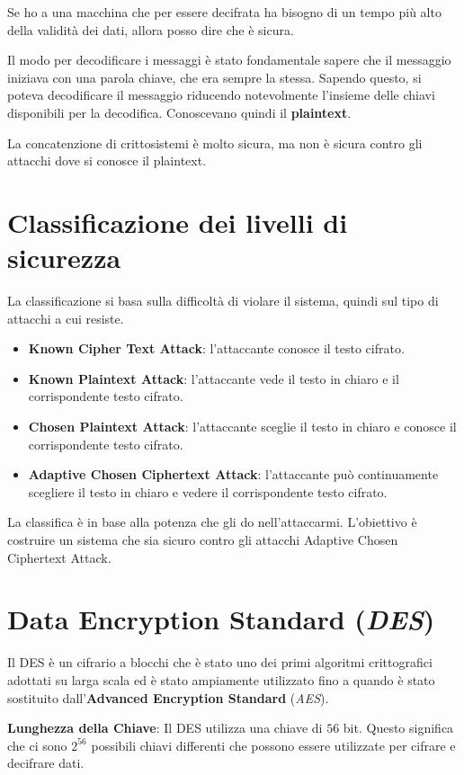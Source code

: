 Se ho a una macchina che per essere decifrata ha bisogno di un tempo più alto della validità 
dei dati, allora posso dire che è sicura.

Il modo per decodificare i messaggi è stato fondamentale sapere che il messaggio iniziava con
una parola chiave, che era sempre la stessa. Sapendo questo, si poteva decodificare il messaggio
riducendo notevolmente l'insieme delle chiavi disponibili per la decodifica.
Conoscevano quindi il \textbf{plaintext}.

La concatenzione di crittosistemi è molto sicura, ma non è sicura contro gli attacchi
dove si conosce il plaintext.

\section{Classificazione dei livelli di sicurezza}
La classificazione si basa sulla difficoltà di violare il sistema, quindi sul tipo di 
attacchi a cui resiste.
\begin{itemize}
    \item \textbf{Known Cipher Text Attack}: l'attaccante conosce il testo cifrato.
    \item \textbf{Known Plaintext Attack}: l'attaccante vede il testo in chiaro e il corrispondente testo cifrato.
    \item \textbf{Chosen Plaintext Attack}: l'attaccante sceglie il testo in chiaro e conosce il corrispondente testo cifrato.
    \item \textbf{Adaptive Chosen Ciphertext Attack}: l'attaccante può continuamente scegliere il testo in chiaro e vedere il corrispondente testo cifrato.
\end{itemize}
La classifica è in base alla potenza che gli do nell'attaccarmi.
L'obiettivo è costruire un sistema che sia sicuro contro 
gli attacchi Adaptive Chosen Ciphertext Attack.
\section{Data Encryption Standard (\textit{DES})} \label{section:des}
Il DES è un cifrario a blocchi che è stato uno dei primi algoritmi
crittografici adottati su larga scala ed è stato ampiamente utilizzato
fino a quando è stato sostituito dall'\textbf{Advanced Encryption Standard} (\textit{AES}).

\textbf{Lunghezza della Chiave}: Il DES utilizza una chiave di $56$ bit.
Questo significa che ci sono $2^{56}$ possibili chiavi differenti che possono
essere utilizzate per cifrare e decifrare dati.

